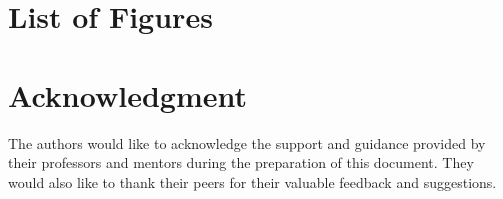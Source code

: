 \documentclass[twoside,a4paper,journal]{IEEEtran}
\begin{document}
\section{List of Figures}
\renewcommand{\listfigurename}{}
\listoffigures



\section*{Acknowledgment}
The authors would like to acknowledge the support and guidance provided by
their professors and mentors during the preparation of this document.
They would also like to thank their peers for their valuable feedback and
suggestions.

\ifCLASSOPTIONcaptionsoff
  \newpage
\fi





%
%
%
%
%
\end{document}
